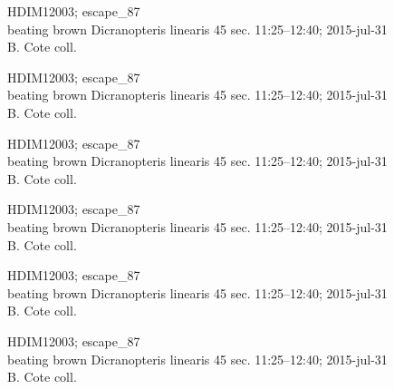 \documentclass[2pt]{extarticle}
\begin{document}
\noindent
\parbox{0.16\textwidth}{\tiny \raggedright \rule[-0.3\baselineskip]{0pt}{10pt}HDIM12003; escape\_87\\ beating brown Dicranopteris linearis 45 sec. 11:25--12:40; 2015-jul-31\\ B. Cote coll.}
\parbox{0.16\textwidth}{\tiny \raggedright \rule[-0.3\baselineskip]{0pt}{10pt}HDIM12003; escape\_87\\ beating brown Dicranopteris linearis 45 sec. 11:25--12:40; 2015-jul-31\\ B. Cote coll.}
\parbox{0.16\textwidth}{\tiny \raggedright \rule[-0.3\baselineskip]{0pt}{10pt}HDIM12003; escape\_87\\ beating brown Dicranopteris linearis 45 sec. 11:25--12:40; 2015-jul-31\\ B. Cote coll.}
\parbox{0.16\textwidth}{\tiny \raggedright \rule[-0.3\baselineskip]{0pt}{10pt}HDIM12003; escape\_87\\ beating brown Dicranopteris linearis 45 sec. 11:25--12:40; 2015-jul-31\\ B. Cote coll.}
\parbox{0.16\textwidth}{\tiny \raggedright \rule[-0.3\baselineskip]{0pt}{10pt}HDIM12003; escape\_87\\ beating brown Dicranopteris linearis 45 sec. 11:25--12:40; 2015-jul-31\\ B. Cote coll.}
\parbox{0.16\textwidth}{\tiny \raggedright \rule[-0.3\baselineskip]{0pt}{10pt}HDIM12003; escape\_87\\ beating brown Dicranopteris linearis 45 sec. 11:25--12:40; 2015-jul-31\\ B. Cote coll.} \\ 
\vspace{0.001in} 
\end{document}
